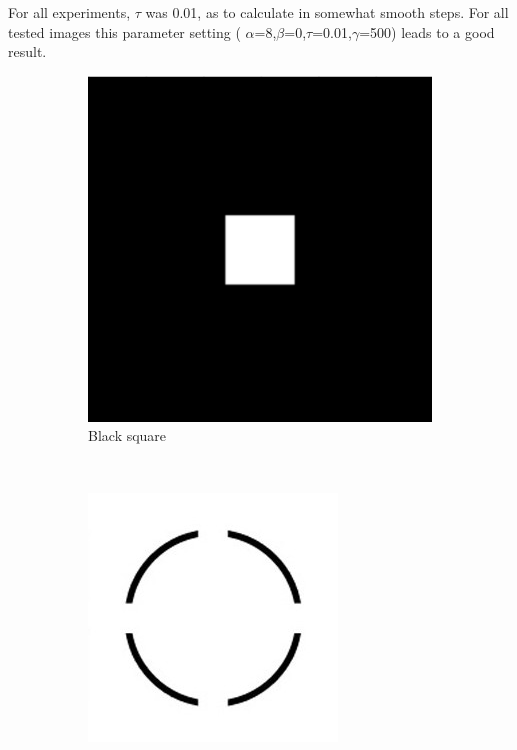 \documentclass[paper=a4, fontsize=11pt]{scrartcl} %
\numberwithin{equation}{section} %
\numberwithin{figure}{section} %
\numberwithin{table}{section} %
\begin{document}
For all experiments, $\tau$ was 0.01, as to calculate in somewhat smooth steps. For all tested images this parameter setting ( $\alpha$=8,$\beta$=0,$\tau$=0.01,$\gamma$=500) leads to a good result.\\
\begin{figure}[H]
        \centering
        \begin{subfigure}[b]{0.2\textwidth}
                \includegraphics[width=\textwidth]{blacksquare.png}
                \caption{Black square}
                \label{fig:Blacksquare}
        \end{subfigure}%
        ~ %
        \begin{subfigure}[b]{0.2\textwidth}
                \includegraphics[width=\textwidth]{gestalt}

\end{subfigure}
\end{figure}
\end{document}
